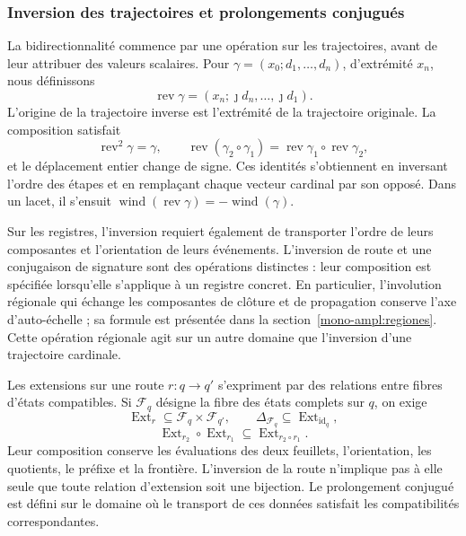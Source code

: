 \subsubsection{Inversion des trajectoires et prolongements conjugués}
\label{tpk-int:bidireccionalidad}

La bidirectionnalité commence par une opération sur les trajectoires, avant
de leur attribuer des valeurs scalaires. Pour
\(\gamma=(x_0;d_1,\ldots,d_n)\), d'extrémité \(x_n\), nous définissons
\[
 \operatorname{rev}\gamma
   =(x_n;\jmath d_n,\ldots,\jmath d_1).
\]
L'origine de la trajectoire inverse est l'extrémité de la trajectoire originale.
La composition satisfait
\[
 \operatorname{rev}^2\gamma=\gamma,\qquad
 \operatorname{rev}(\gamma_2\circ\gamma_1)
   =\operatorname{rev}\gamma_1\circ\operatorname{rev}\gamma_2,
\]
et le déplacement entier change de signe. Ces identités s'obtiennent
en inversant l'ordre des étapes et en remplaçant chaque vecteur cardinal par
son opposé. Dans un lacet, il s'ensuit
\(\operatorname{wind}(\operatorname{rev}\gamma)
=-\operatorname{wind}(\gamma)\).

Sur les registres, l'inversion requiert également de transporter l'ordre
de leurs composantes et l'orientation de leurs événements. L'inversion de
route et une conjugaison de signature sont des opérations distinctes : leur
composition est spécifiée lorsqu'elle s'applique à un registre concret. En
particulier, l'involution régionale qui échange les composantes de
clôture et de propagation conserve l'axe d'auto-échelle ; sa formule est
présentée dans la section~\ref{mono-ampl:regiones}. Cette opération régionale
agit sur un autre domaine que l'inversion d'une trajectoire cardinale.

Les extensions sur une route \(r:q\to q'\) s'expriment par des relations entre fibres d'états compatibles. Si \(\mathcal F_q\) désigne la fibre des états complets sur \(q\), on exige
\[
 \operatorname{Ext}_r\subseteq\mathcal F_q\times\mathcal F_{q'},
 \qquad \Delta_{\mathcal F_q}\subseteq
        \operatorname{Ext}_{\operatorname{id}_q},
\]
\[
 \operatorname{Ext}_{r_2}\circ\operatorname{Ext}_{r_1}
       \subseteq\operatorname{Ext}_{r_2\circ r_1}.
\]
Leur composition conserve les évaluations des deux feuillets, l'orientation,
les quotients, le préfixe et la frontière. L'inversion de la route
n'implique pas à elle seule que toute relation d'extension soit une bijection.
Le prolongement conjugué est défini sur le domaine où le transport de
ces données satisfait les compatibilités correspondantes.

